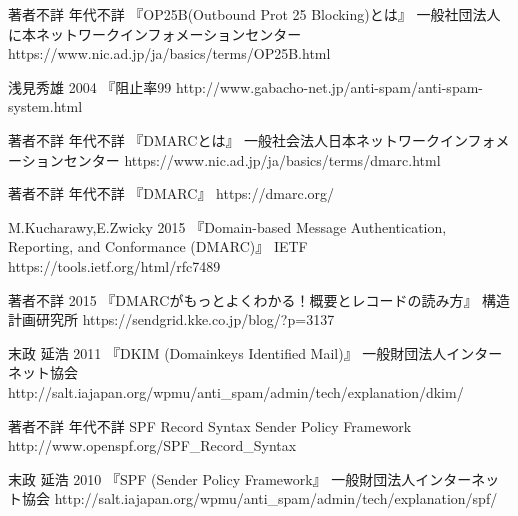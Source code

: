 \begin{thebibliography}{99}

\item
	著者不詳
	年代不詳
	『OP25B(Outbound Prot 25 Blocking)とは』
	一般社団法人に本ネットワークインフォメーションセンター
	https://www.nic.ad.jp/ja/basics/terms/OP25B.html

\item
	浅見秀雄
	2004
	『阻止率99%
	http://www.gabacho-net.jp/anti-spam/anti-spam-system.html

\item
	著者不詳
	年代不詳
	『DMARCとは』
	一般社会法人日本ネットワークインフォメーションセンター
	https://www.nic.ad.jp/ja/basics/terms/dmarc.html

\item
	著者不詳
	年代不詳
	『DMARC』
	https://dmarc.org/

\item
	M.Kucharawy,E.Zwicky
	2015
	『Domain-based Message Authentication, Reporting, and Conformance (DMARC)』
	IETF
	https://tools.ietf.org/html/rfc7489
	
\item
	著者不詳
	2015
	『DMARCがもっとよくわかる！概要とレコードの読み方』
	構造計画研究所
	https://sendgrid.kke.co.jp/blog/?p=3137	
	
\item
	末政 延浩
	2011
	『DKIM (Domainkeys Identified Mail)』
	一般財団法人インターネット協会
	http://salt.iajapan.org/wpmu/anti\_spam/admin/tech/explanation/dkim/




\item
	著者不詳
	年代不詳
	SPF Record Syntax
	Sender Policy Framework
	http://www.openspf.org/SPF\_Record\_Syntax

\item
	末政 延浩
	2010
	『SPF (Sender Policy Framework』	
	一般財団法人インターネット協会
	http://salt.iajapan.org/wpmu/anti\_spam/admin/tech/explanation/spf/


\end{thebibliography}